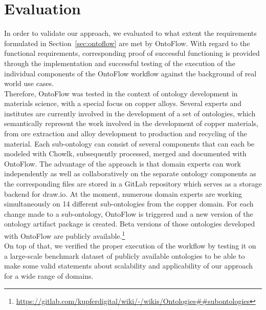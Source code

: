 \documentclass[runningheads]{llncs}
\begin{document}
\section{Evaluation}\label{sec:eval}
In order to validate our approach, we evaluated to what extent the requirements formulated in Section~\ref{sec:ontoflow} are met by OntoFlow. With regard to the functional requirements, corresponding proof of successful functioning is provided through the implementation and successful testing of the execution of the individual components of the OntoFlow workflow against the background of real world use cases.\\ Therefore, OntoFlow was tested in the context of ontology development in materials science, with a special focus on copper alloys. Several experts and institutes are currently involved in the development of a set of ontologies, which semantically represent the work involved in the development of copper materials, from ore extraction and alloy development to production and recycling of the material. Each sub-ontology can consist of several components that can each be modeled with Chowlk, subsequently processed, merged and documented with OntoFlow. The advantage of the approach is that domain experts can work independently as well as collaboratively on the separate ontology components as the corresponding files are stored in a GitLab repository which  serves as a storage backend for draw.io. At the moment, numerous domain experts are working simultaneously on 14 different sub-ontologies from the copper domain. For each change made to a sub-ontology, OntoFlow is triggered and a new version of the ontology artifact package is created. Beta versions of those ontologies developed with OntoFlow are publicly available.\footnote{\url{https://gitlab.com/kupferdigital/wiki/-/wikis/Ontologies##subontologies}}\\
On top of that, we verified the proper execution of the workflow by testing it on a large-scale benchmark dataset of publicly available ontologies to be able to make some valid statements about scalability and applicability of our approach for a wide range of domains.
\end{document}
